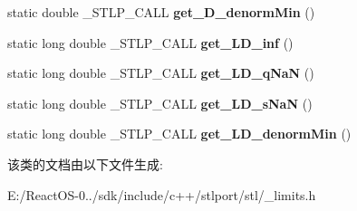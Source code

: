\begin{DoxyCompactItemize}
static double \+\_\+\+S\+T\+L\+P\+\_\+\+C\+A\+LL {\bfseries get\+\_\+\+D\+\_\+denorm\+Min} ()
\item 
\mbox{\label{class___lim_g_ab0276bc60337c70171fee6626e95c249}} 
static long double \+\_\+\+S\+T\+L\+P\+\_\+\+C\+A\+LL {\bfseries get\+\_\+\+L\+D\+\_\+inf} ()
\item 
\mbox{\label{class___lim_g_a397a673b8a9083eac5b8a6ea7a9a1230}} 
static long double \+\_\+\+S\+T\+L\+P\+\_\+\+C\+A\+LL {\bfseries get\+\_\+\+L\+D\+\_\+q\+NaN} ()
\item 
\mbox{\label{class___lim_g_a6bc373c6f265f71066b6edff206bf8ed}} 
static long double \+\_\+\+S\+T\+L\+P\+\_\+\+C\+A\+LL {\bfseries get\+\_\+\+L\+D\+\_\+s\+NaN} ()
\item 
\mbox{\label{class___lim_g_a92baafce11afc221683c6e4bcfdadb93}} 
static long double \+\_\+\+S\+T\+L\+P\+\_\+\+C\+A\+LL {\bfseries get\+\_\+\+L\+D\+\_\+denorm\+Min} ()
\end{DoxyCompactItemize}


该类的文档由以下文件生成\+:\begin{DoxyCompactItemize}
\item 
E\+:/\+React\+O\+S-\/0../sdk/include/c++/stlport/stl/\+\_\+limits.\+h\end{DoxyCompactItemize}
